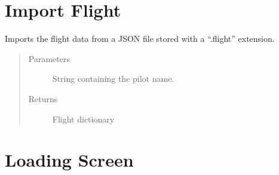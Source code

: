 \documentclass[letterpaper,10pt,english]{sphinxmanual}
\begin{document}
\chapter{Import Flight}
\label{\detokenize{index:module-src.Export.ImportFile}}\label{\detokenize{index:import-flight}}

\begin{fulllineitems}
\label{\detokenize{index:src.Export.ImportFile.importData}}
Imports the flight data from a JSON file stored with a “.flight” extension.
\begin{quote}\begin{description}
\item[{Parameters}] \leavevmode
{} \textendash{} String containing the pilot name.

\item[{Returns}] \leavevmode
Flight dictionary

\end{description}\end{quote}

\end{fulllineitems}



\chapter{Loading Screen}
\label{\detokenize{index:module-src.Views.View_LoadingScreen}}\label{\detokenize{index:loading-screen}}
\end{document}
